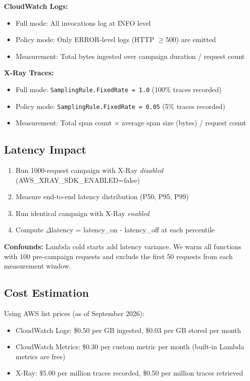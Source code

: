 \textbf{CloudWatch Logs:}
\begin{itemize}
    \item Full mode: All invocations log at INFO level
    \item Policy mode: Only ERROR-level logs (HTTP $\geq$500) are emitted
    \item Measurement: Total bytes ingested over campaign duration / request count
\end{itemize}

\textbf{X-Ray Traces:}
\begin{itemize}
    \item Full mode: \texttt{SamplingRule.FixedRate = 1.0} (100\% traces recorded)
    \item Policy mode: \texttt{SamplingRule.FixedRate = 0.05} (5\% traces recorded)
    \item Measurement: Total span count × average span size (bytes) / request count
\end{itemize}

\subsection{Latency Impact}

\begin{enumerate}
    \item Run 1000-request campaign with X-Ray \textit{disabled} (AWS\_XRAY\_SDK\_ENABLED=false)
    \item Measure end-to-end latency distribution (P50, P95, P99)
    \item Run identical campaign with X-Ray \textit{enabled}
    \item Compute $\Delta$latency = latency\_on - latency\_off at each percentile
\end{enumerate}

\textbf{Confounds:} Lambda cold starts add latency variance. We warm all functions with 100 pre-campaign requests and exclude the first 50 requests from each measurement window.

\subsection{Cost Estimation}

Using AWS list prices (as of September 2026):

\begin{itemize}
    \item CloudWatch Logs: \$0.50 per GB ingested, \$0.03 per GB stored per month
    \item CloudWatch Metrics: \$0.30 per custom metric per month (built-in Lambda metrics are free)
    \item X-Ray: \$5.00 per million traces recorded, \$0.50 per million traces retrieved
\end{itemize}

